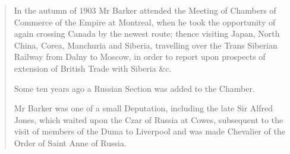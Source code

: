 \begin{quotation}
In the autumn of 1903 Mr Barker attended the Meeting of Chambers of Commerce of the Empire at Montreal, when he took the opportunity of again crossing Canada by the newest route; thence visiting Japan, North China, Corea, Manchuria and Siberia, travelling over the Trans Siberian Railway from Dalny to Moscow, in order to report upon prospects of extension of British Trade with Siberia \&c.

Some ten years ago a Russian Section was added to the Chamber.

Mr Barker was one of a small Deputation, including the late Sir Alfred Jones, which waited upon the Czar of Russia at Cowes, subsequent to the visit of members of the Duma to Liverpool and was made Chevalier of the Order of Saint Anne of Russia.
\end{quotation}


